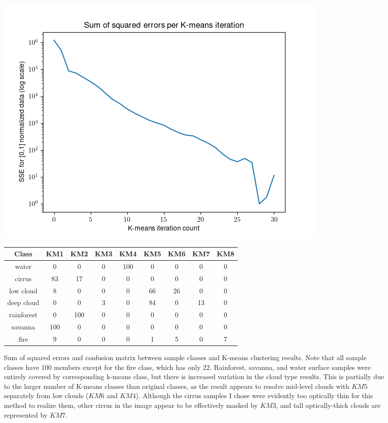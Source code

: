 \documentclass[12pt]{article}
\begin{document}
\begin{figure}[h!]
    \centering
    \includegraphics[width=.8\linewidth]{figures/k_means_sse_2.png}

    \begin{tabular}{c | c c c c c c c c }
        Class & KM1 & KM2 & KM3 & KM4 & KM5 & KM6 & KM7 & KM8 \\
        \hline
        water & 0 & 0 & 0 & 100 & 0 & 0 & 0 & 0 \\
        cirrus & 83 & 17 & 0 & 0 & 0 & 0 & 0 & 0 \\
        low cloud & 8 & 0 & 0 & 0 & 66 & 26 & 0 & 0 \\
        deep cloud & 0 & 0 & 3 & 0 & 84 & 0 & 13 & 0 \\
        rainforest & 0 & 100 & 0 & 0 & 0 & 0 & 0 & 0 \\
        savanna & 100 & 0 & 0 & 0 & 0 & 0 & 0 & 0 \\
        fire & 9 & 0 & 0 & 0 & 1 & 5 & 0 & 7 \\
    \end{tabular}
    \caption{Sum of squared errors and confusion matrix between sample classes and K-means clustering results. Note that all sample classes have 100 members except for the fire class, which has only 22. Rainforest, savanna, and water surface samples were entirely covered by corresponding k-means class, but there is increased variation in the cloud type results. This is partially due to the larger number of K-means classes than original classes, as the result appears to resolve mid-level clouds with $KM5$ separately from low clouds ($KM6$ and $KM4$). Although the cirrus samples I chose were evidently too optically thin for this method to realize them, other cirrus in the image appear to be effectively masked by $KM3$, and tall optically-thick clouds are represented by $KM7$.}
\end{figure}
\end{document}
